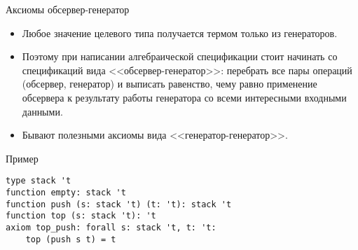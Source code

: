 \documentclass[hyperref={unicode=true}]{beamer}
\begin{document}
    \begin{frame}{Аксиомы обсервер-генератор}
    \begin{itemize}
    \item
    Любое значение целевого типа получается термом
    только из генераторов.
    \item
    Поэтому при написании алгебраической спецификации
    стоит начинать со спецификаций вида <<обсервер-генератор>>:
    перебрать все пары операций (обсервер, генератор)
    и выписать равенство, чему равно применение обсервера
    к результату работы генератора со всеми интересными
    входными данными.
    \item
    Бывают полезными аксиомы вида <<генератор-генератор>>.
    \end{itemize}
    \end{frame}

    \begin{frame}[fragile]{Пример}
    \begin{lstlisting}
type stack 't
function empty: stack 't
function push (s: stack 't) (t: 't): stack 't
function top (s: stack 't): 't
axiom top_push: forall s: stack 't, t: 't:
    top (push s t) = t
    \end{lstlisting}
    \end{frame}
\end{document}
